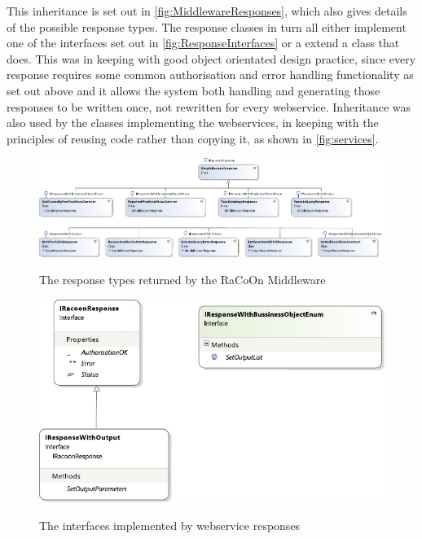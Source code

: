 This inheritance is set out in \autoref{fig:MiddlewareResponses}, which also gives details of the possible response types. The response classes in turn all either implement one of the interfaces set out in \autoref{fig:ResponseInterfaces} or a extend a class that does. This was in keeping with good object orientated design practice, since every response requires some common authorisation and error handling functionality as set out above and it allows the system both handling and generating those responses to be written once, not rewritten for every webservice.  Inheritance was also used by the classes implementing the webservices, in keeping with the principles of reusing code rather than copying it, as shown in \autoref{fig:services}.

\begin{figure}
\myfloatalign
{\includegraphics[width=\paperwidth]{gfx/MiddlewareServicesClassesResponseOnly}} 
\caption{The response types returned by the RaCoOn Middleware}
\label{fig:MiddlewareResponses}
\end{figure}

 \begin{figure}
\myfloatalign
{\includegraphics[width=\textwidth]{gfx/Res}} 
\caption{The interfaces implemented by webservice responses}
\label{fig:ResponseInterfaces}
\end{figure}

